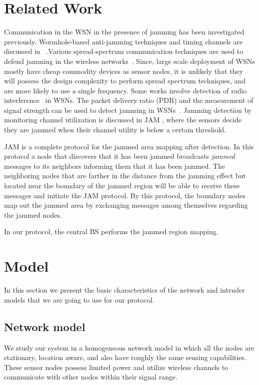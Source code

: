\documentclass[conference]{IEEEtran}
\begin{document}
\section{Related Work}
\label{rel}

Communication in the WSN in the presence of jamming has been investigated previously. Wormhole-based anti-jamming techniques and timing channels are discussed in ~\cite{PERF, cagalj07, Xu2008Antijamming}.Various spread-spectrum communication techniques are used to defend jamming in the wireless networks~\cite{ATTJAM, ATTJAM2, Xu04channelsurfing}. Since, large scale deployment of WSNs mostly have cheap commodity devices as sensor nodes, it is unlikely that they will possess the design complexity to perform spread spectrum techniques, and are more likely to use a single frequency. Some works involve detection of radio interference~\cite{RID_RADIO} in WSNs. The packet delivery ratio (PDR) and the measurement of signal strength can be used to detect jamming in WSNs~\cite{FEASJAM}. Jamming detection by monitoring channel utilization is discussed in JAM \cite{JAM}, where the sensors decide they are jammed when their channel utility is below a certain threshold.

JAM \cite{JAM} is a complete protocol for the jammed area mapping after detection. In this protocol a node that discovers that it has been jammed broadcasts {\em jammed} messages to its neighbors informing them that it has been jammed. The neighboring nodes that are farther in the distance from the jamming effect but located near the boundary of the jammed region will be able to receive these messages and initiate the JAM protocol. By this protocol, the boundary nodes map out the jammed area by exchanging messages among themselves regarding the jammed nodes.

In our protocol, the central BS performs the jammed region mapping.

\section{Model}
\label{model}

In this section we present the basic characteristics of the network and intruder models that we are going to use for our protocol.


\subsection{Network model}
We study our system in a homogeneous network model in which all the nodes are stationary, location aware, and also have roughly the same sensing capabilities. These sensor nodes possess limited power and utilize wireless channels to communicate with other nodes within their signal range.
\end{document}
